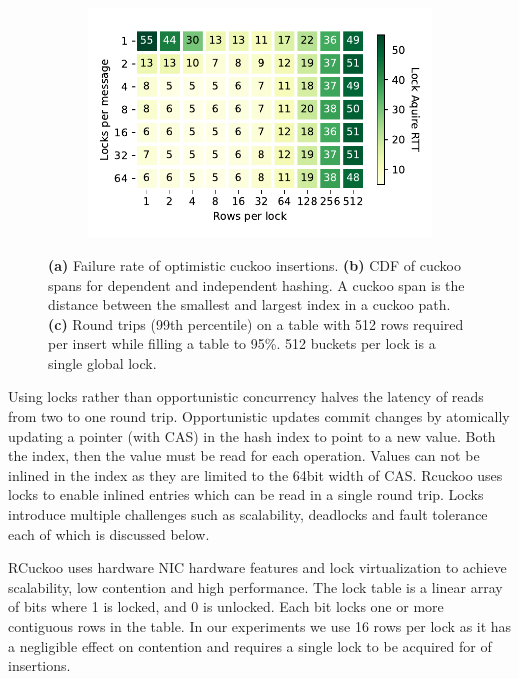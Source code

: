 \begin{figure}[t]
\begin{subfigure}{0.3\linewidth}
    \end{subfigure}
    \begin{subfigure}{0.3\linewidth}
        \includegraphics[width=0.99\linewidth]{fig/buckets_per_lock_vs_locks_per_message.pdf}
    \end{subfigure}
    \vspace{-1em}
    \caption{
    \textbf{(a)} Failure rate of optimistic cuckoo insertions.
    \textbf{(b)} CDF of cuckoo spans for dependent and independent hashing. A cuckoo span is the distance between the smallest and largest index in a cuckoo path.
    \textbf{(c)} Round trips (99th percentile) on a table
    with 512 rows required per insert while filling a table
    to 95\%. 512 buckets per lock is a single global lock.}

    \label{fig:cuckoo-problems}

\end{figure}

Using locks rather than opportunistic concurrency halves the
latency of reads from two to one round trip. Opportunistic
updates commit changes by atomically updating a pointer
(with CAS) in the hash index to point to a new value. Both
the index, then the value must be read for each operation.
Values can not be inlined in the index as they are limited
to the 64bit width of CAS. Rcuckoo uses locks to enable
inlined entries which can be read in a single round trip.
Locks introduce multiple challenges such as scalability,
deadlocks and fault tolerance each of which is discussed
below.

RCuckoo uses hardware NIC hardware features and lock
virtualization to achieve scalability, low contention and
high performance. The lock table is a linear array of bits
where 1 is locked, and 0 is unlocked. Each bit locks one or
more contiguous rows in the table. In our experiments we use
16 rows per lock as it has a negligible effect on contention
and requires a single lock to be acquired for  of insertions.

